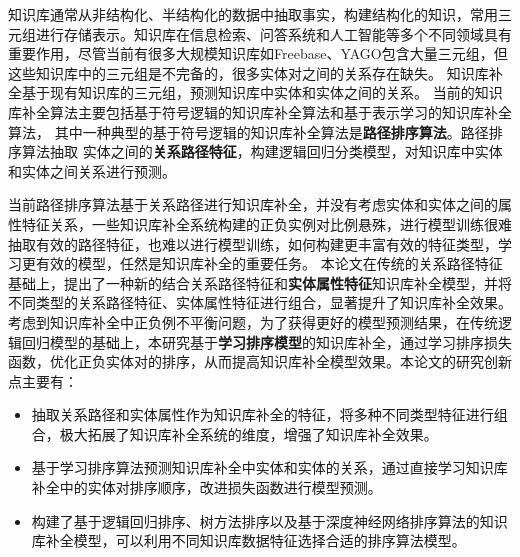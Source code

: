 


\makeatother


\makeatother



\begin{cabstract}
  知识库通常从非结构化、半结构化的数据中抽取事实，构建结构化的知识，常用三元组进行存储表示。知识库在信息检索、问答系统和人工智能等多个不同领域具有重要作用，尽管当前有很多大规模知识库如Freebase、YAGO包含大量三元组，但这些知识库中的三元组是不完备的，很多实体对之间的关系存在缺失。 
  知识库补全基于现有知识库的三元组，预测知识库中实体和实体之间的关系。
  当前的知识库补全算法主要包括基于符号逻辑的知识库补全算法和基于表示学习的知识库补全算法，
  其中一种典型的基于符号逻辑的知识库补全算法是\textbf{路径排序算法}。路径排序算法抽取
  实体之间的\textbf{关系路径特征}，构建逻辑回归分类模型，对知识库中实体和实体之间关系进行预测。

  当前路径排序算法基于关系路径进行知识库补全，并没有考虑实体和实体之间的属性特征关系，一些知识库补全系统构建的正负实例对比例悬殊，进行模型训练很难抽取有效的路径特征，也难以进行模型训练，如何构建更丰富有效的特征类型，学习更有效的模型，任然是知识库补全的重要任务。
  本论文在传统的关系路径特征基础上，提出了一种新的结合关系路径特征和\textbf{实体属性特征}知识库补全模型，并将不同类型的关系路径特征、实体属性特征进行组合，显著提升了知识库补全效果。
  考虑到知识库补全中正负例不平衡问题，为了获得更好的模型预测结果，在传统逻辑回归模型的基础上，本研究基于\textbf{学习排序模型}的知识库补全，通过学习排序损失函数，优化正负实体对的排序，从而提高知识库补全模型效果。本论文的研究创新点主要有：
  \begin{itemize}[$\bullet$]
    \item 抽取关系路径和实体属性作为知识库补全的特征，将多种不同类型特征进行组合，极大拓展了知识库补全系统的维度，增强了知识库补全效果。
    \item 基于学习排序算法预测知识库补全中实体和实体的关系，通过直接学习知识库补全中的实体对排序顺序，改进损失函数进行模型预测。
    \item 构建了基于逻辑回归排序、树方法排序以及基于深度神经网络排序算法的知识库补全模型，可以利用不同知识库数据特征选择合适的排序算法模型。
  \end{itemize}
\end{cabstract}


